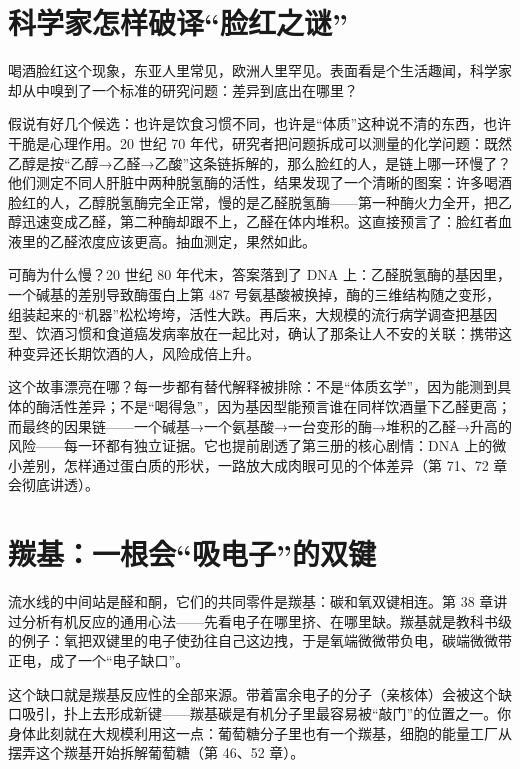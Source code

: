 \section{科学家怎样破译“脸红之谜”}

\begin{zhengju}
喝酒脸红这个现象，东亚人里常见，欧洲人里罕见。表面看是个生活趣闻，科学家却从中嗅到了一个标准的研究问题：差异到底出在哪里？

假说有好几个候选：也许是饮食习惯不同，也许是“体质”这种说不清的东西，也许干脆是心理作用。20 世纪 70 年代，研究者把问题拆成可以测量的化学问题：既然乙醇是按“乙醇→乙醛→乙酸”这条链拆解的，那么脸红的人，是链上哪一环慢了？他们测定不同人肝脏中两种脱氢酶的活性，结果发现了一个清晰的图案：许多喝酒脸红的人，乙醇脱氢酶完全正常，慢的是乙醛脱氢酶——第一种酶火力全开，把乙醇迅速变成乙醛，第二种酶却跟不上，乙醛在体内堆积。这直接预言了：脸红者血液里的乙醛浓度应该更高。抽血测定，果然如此。

可酶为什么慢？20 世纪 80 年代末，答案落到了 DNA 上：乙醛脱氢酶的基因里，一个碱基的差别导致酶蛋白上第 487 号氨基酸被换掉，酶的三维结构随之变形，组装起来的“机器”松松垮垮，活性大跌。再后来，大规模的流行病学调查把基因型、饮酒习惯和食道癌发病率放在一起比对，确认了那条让人不安的关联：携带这种变异还长期饮酒的人，风险成倍上升。

这个故事漂亮在哪？每一步都有替代解释被排除：不是“体质玄学”，因为能测到具体的酶活性差异；不是“喝得急”，因为基因型能预言谁在同样饮酒量下乙醛更高；而最终的因果链——一个碱基→一个氨基酸→一台变形的酶→堆积的乙醛→升高的风险——每一环都有独立证据。它也提前剧透了第三册的核心剧情：DNA 上的微小差别，怎样通过蛋白质的形状，一路放大成肉眼可见的个体差异（第 71、72 章会彻底讲透）。
\end{zhengju}

\section{羰基：一根会“吸电子”的双键}

流水线的中间站是醛和酮，它们的共同零件是羰基：碳和氧双键相连。第 38 章讲过分析有机反应的通用心法——先看电子在哪里挤、在哪里缺。羰基就是教科书级的例子：氧把双键里的电子使劲往自己这边拽，于是氧端微微带负电，碳端微微带正电，成了一个“电子缺口”。

这个缺口就是羰基反应性的全部来源。带着富余电子的分子（亲核体）会被这个缺口吸引，扑上去形成新键——羰基碳是有机分子里最容易被“敲门”的位置之一。你身体此刻就在大规模利用这一点：葡萄糖分子里也有一个羰基，细胞的能量工厂从摆弄这个羰基开始拆解葡萄糖（第 46、52 章）。

